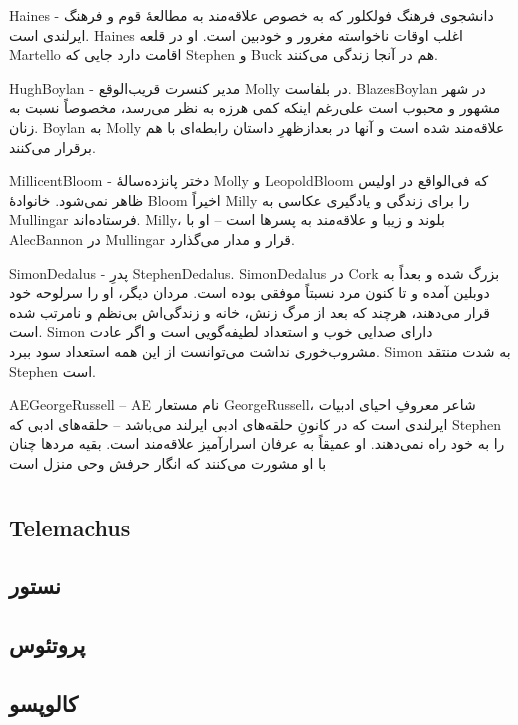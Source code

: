 \documentclass[12pt,onecolumn,a4paper]{book}
\begin{document}
    \gls{Haines} - دانشجوی فرهنگ فولکلور که به خصوص علاقه‌مند به مطالعۀ قوم و فرهنگ ایرلندی است. \gls{Haines} اغلب اوقات ناخواسته مغرور و خودبین است. او در قلعه \gls{Martello} اقامت دارد جایی که \gls{Stephen} و \gls{Buck} هم در آنجا زندگی می‌کنند.

    \gls{HughBoylan} - مدیر کنسرت قریب‌الوقع \gls{Molly} در بلفاست. \gls{BlazesBoylan} در شهر مشهور و محبوب است علی‌رغم اینکه کمی هرزه به نظر می‌رسد، مخصوصاً نسبت به زنان. \gls{Boylan} به \gls{Molly} علاقه‌مند شده است و آنها در بعدازظهرِ داستان رابطه‌ای با هم برقرار می‌کنند.

    \gls{MillicentBloom} - دختر پانزده‌سالۀ \gls{Molly} و \gls{LeopoldBloom} که فی‌الواقع در اولیس ظاهر نمی‌شود. خانوادۀ \gls{Bloom} اخیراً \gls{Milly} را برای زندگی و یادگیری عکاسی به \gls{Mullingar} فرستاده‌اند. \gls{Milly}، بلوند و زیبا و علاقه‌مند به پسرها است – او با \gls{AlecBannon} در \gls{Mullingar} قرار و مدار می‌گذارد.

    \gls{SimonDedalus} - پدرِ \gls{StephenDedalus}. \gls{SimonDedalus} در \gls{Cork} بزرگ شده و بعداً به دوبلین آمده و تا کنون مرد نسبتاً موفقی بوده است. مردان دیگر، او را سرلوحه خود قرار می‌دهند، هرچند که بعد از مرگ زنش، خانه و زندگی‌اش بی‌نظم و نامرتب شده است. \gls{Simon} دارای صدایی خوب و استعداد لطیفه‌گویی است و اگر عادت مشروب‌خوری نداشت می‌توانست از این همه استعداد سود ببرد. \gls{Simon} به شدت منتقد \gls{Stephen} است.

   \gls{AEGeorgeRussell} – \gls{AE} نام مستعار \gls{GeorgeRussell}، شاعر معروفِ احیای ادبیات ایرلندی است که در کانونِ حلقه‌های ادبی ایرلند می‌باشد – حلقه‌های ادبی که \gls{Stephen} را به خود راه نمی‌دهند. او عمیقاً به عرفان اسرارآمیز علاقه‌مند است. بقیه مردها چنان با او مشورت می‌کنند که انگار حرفش وحی منزل است
    \part{}
    \chapter[\glsentryname{Telemachus}]{\gls{Telemachus}}

    \chapter{نستور}
    \chapter{پروتئوس}
    \chapter{کالوپسو}
\end{document}
